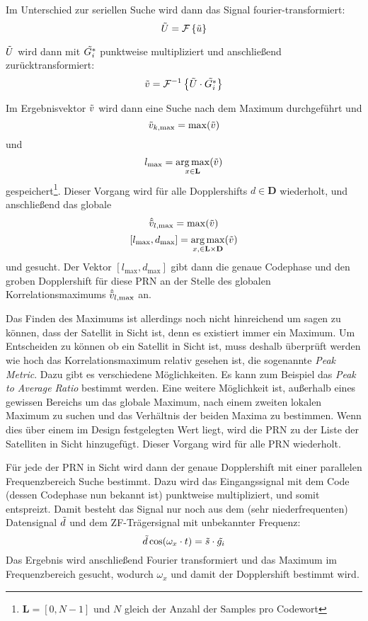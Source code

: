 Im Unterschied zur seriellen Suche wird dann das Signal  fourier-transformiert:
\begin{equation}
	\tilde{U}=\mathcal{F}\left\{\tilde{u}\right\}
\end{equation}

$\tilde{U}$ wird dann mit $\tilde{G_i^*}$ punktweise multipliziert und anschließend zurücktransformiert: 
\begin{equation}
	\tilde{v}=\mathcal{F}^{-1}\left\{\tilde{U} \cdot \tilde{G_i^*}\right\}
\end{equation}

Im Ergebnisvektor $\tilde{v}$ wird dann eine Suche nach dem Maximum durchgeführt und 
\begin{equation}
	\tilde{v}_{k,\max}=\max(\tilde{v})
\end{equation}
und
\begin{equation}
     l_{\max}=\operatorname*{arg\,max}_{x\in \textbf{L}}(\tilde{v})
\end{equation} 
gespeichert\footnote{$\textbf{L}=[0, N-1]$ und $N$ gleich der Anzahl der Samples pro Codewort}. Dieser Vorgang wird für alle Dopplershifts $d\in \textbf{D}$ wiederholt, und anschließend das globale 
\begin{equation}
	\hat{\tilde{v}}_{l,\max}=\max(\tilde{v})
\end{equation}
\begin{equation}
	\left[l_{\max}, d_{\max}\right]=\operatorname*{arg\,max}_{x,\in \bf{L} \times \bf{D}}(\tilde{v})
\end{equation}
und gesucht. Der Vektor $\left[l_{\max}, d_{\max}\right]$ gibt dann die genaue Codephase und den groben Dopplershift für diese PRN an der Stelle des globalen Korrelationsmaximums $\hat{\tilde{v}}_{l,\max}$ an. 

Das Finden des Maximums ist allerdings noch nicht hinreichend um sagen zu können, dass der Satellit in Sicht ist, denn es existiert immer ein Maximum. Um Entscheiden zu können ob ein Satellit in Sicht ist, muss deshalb überprüft werden wie hoch das Korrelationsmaximum relativ gesehen ist, die sogenannte \emph{Peak Metric}. Dazu gibt es verschiedene Möglichkeiten. Es kann zum Beispiel das \emph{Peak to Average Ratio} bestimmt werden. Eine weitere Möglichkeit ist, außerhalb eines gewissen Bereichs um das globale Maximum, nach einem zweiten lokalen Maximum zu suchen und das Verhältnis der beiden Maxima zu bestimmen.
Wenn dies über einem im Design festgelegten Wert liegt, wird die PRN zu der Liste der Satelliten in Sicht hinzugefügt. Dieser Vorgang wird für alle PRN wiederholt. 

Für jede der PRN in Sicht wird dann der genaue Dopplershift mit einer parallelen Frequenzbereich Suche bestimmt. Dazu wird das Eingangssignal mit dem Code (dessen Codephase nun bekannt ist) punktweise multipliziert, und somit entspreizt. Damit besteht das Signal nur noch aus dem (sehr niederfrequenten) Datensignal $\tilde{d}$ und dem ZF-Trägersignal mit unbekannter Frequenz:
\begin{equation}
	\tilde{d} \cos(\omega_x \cdot t) = \tilde{s} \cdot \tilde{g_i}
\end{equation}
Das Ergebnis wird anschließend Fourier transformiert und das Maximum im Frequenzbereich gesucht, wodurch $\omega_x$ und damit der Dopplershift bestimmt wird.

